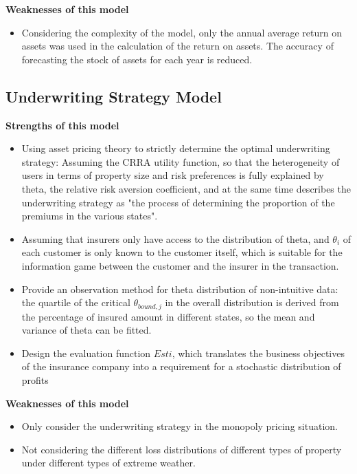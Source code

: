 \documentclass[12pt]{article}  %
\begin{document}
\textbf{Weaknesses of this model}
\begin{itemize}
    \item Considering the complexity of the model, only the annual average return on assets was used in the calculation of the return on assets. The accuracy of forecasting the stock of assets for each year is reduced.
 \end{itemize}

\subsection{Underwriting Strategy Model}
\textbf{Strengths of this model}
\begin{itemize}
    \item Using asset pricing theory to strictly determine the optimal underwriting strategy: Assuming the CRRA utility function, so that the heterogeneity of users in terms of property size and risk preferences is fully explained by theta, the relative risk aversion coefficient, and at the same time describes the underwriting strategy as "the process of determining the proportion of the premiums in the various states".
    \item Assuming that insurers only have access to the distribution of theta, and $\theta_i$ of each customer is only known to the customer itself, which is suitable for the information game between the customer and the insurer in the transaction.
    \item Provide an observation method for theta distribution of non-intuitive data: the quartile of the critical $\theta_{bound,j}$ in the overall distribution is derived from the percentage of insured amount in different states, so the mean and variance of theta can be fitted.
    \item Design the evaluation function $Esti$, which translates the business objectives of the insurance company into a requirement for a stochastic distribution of profits
\end{itemize}

\textbf{Weaknesses of this model}
\begin{itemize}
    \item Only consider the underwriting strategy in the monopoly pricing situation.
    \item Not considering the different loss distributions of different types of property under different types of extreme weather.
 \end{itemize}
\end{document}
